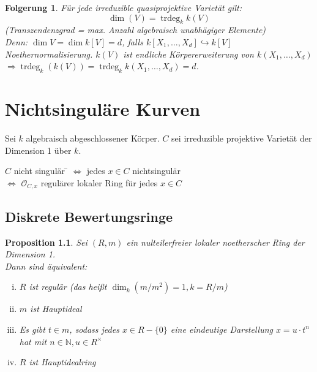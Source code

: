 \documentclass[a4paper,12pt]{report}
\theoremstyle{break}
\newtheorem{Prop}[Def]{Proposition}
\newtheorem{Folg}[Def]{Folgerung}
\theoremstyle{nonumberbreak}
\theoremstyle{nonumberplain}
\DeclareMathOperator{\trdeg}{trdeg}
\newcommand{\N}{\mathbb{N}}
\newcommand{\calO}{\mathcal{O}}
\begin{document}
\begin{Folg}
F\"ur jede irreduzible quasiprojektive Variet\"at gilt:
\[\dim(V)=\trdeg_kk(V)\]
(Transzendenzgrad = max. Anzahl algebraisch unabh\"agiger Elemente)\\
\emph{Denn:} $\dim V=\dim k[V]=d$, falls $k[X_1,\ldots ,X_d]\hookrightarrow k[V]$ Noethernormalisierung. $k(V)$ ist endliche K\"orpererweiterung von $k(X_1,\ldots ,X_d)$ $\Rightarrow \trdeg_k(k(V))=\trdeg_kk(X_1,\ldots ,X_d)=d$.
\end{Folg}

\newpage


\chapter{Nichtsingul\"are Kurven}
\setcounter{section}{19}
Sei $k$ algebraisch abgeschlossener K\"orper. $C$ sei irreduzible projektive Variet\"at der Dimension 1 \"uber $k$.
\begin{tabbing}
$C$ nicht singul\"ar \= $\Leftrightarrow$ jedes $x\in C$ nichtsingul\"ar\\
\> $\Leftrightarrow$ $\calO_{C,x}$ regul\"arer lokaler Ring f\"ur jedes $x\in C$
\end{tabbing}

\section{Diskrete Bewertungsringe}

\begin{Prop}\label{20.1}
Sei $(R,m)$ ein nulteilerfreier lokaler noetherscher Ring der Dimension 1.\\
Dann sind \"aquivalent:\begin{enumerate}[i)]
\item
	$R$ ist regul\"ar (das hei\ss t $\dim_k(m/m^2)=1, k=R/m$)
\item
	$m$ ist Hauptideal
\item
	Es gibt $t\in m$, sodass jedes $x\in R-\{0\}$ eine eindeutige Darstellung $x=u\cdot t^n$ hat mit $n\in \N, u\in R^\times$
\item
	$R$ ist Hauptidealring
\end{enumerate}\end{Prop}
\end{document}
